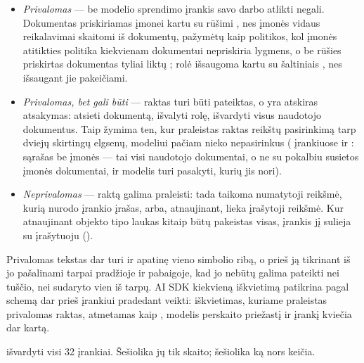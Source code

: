 \begin{itemize}
  \item \emph{Privalomas} --- be modelio sprendimo įrankis savo darbo atlikti negali. Dokumentas
    priskiriamas įmonei kartu su rūšimi , nes įmonės vidaus reikalavimai skaitomi iš
    dokumentų, pažymėtų kaip politikos, kol įmonės atitikties politika kiekvienam dokumentui
    nepriskiria lygmens, o be rūšies priskirtas dokumentas tyliai liktų ; rolė
    išsaugoma kartu su šaltiniais , nes išsaugant jie pakeičiami.
  \item \emph{Privalomas, bet gali būti } --- raktas turi būti pateiktas, o
     yra atskiras atsakymas: atsieti dokumentą, išvalyti rolę, išvardyti visus
    naudotojo dokumentus. Taip žymima ten, kur praleistas raktas reikštų pasirinkimą tarp
    dviejų skirtingų elgsenų, modeliui pačiam nieko nepasirinkus ( įrankiuose
     ir : sąrašas be įmonės --- tai visi
    naudotojo dokumentai, o ne su pokalbiu susietos įmonės dokumentai, ir modelis turi
    pasakyti, kurių jis nori).
  \item \emph{Neprivalomas} --- raktą galima praleisti: tada taikoma numatytoji reikšmė, kurią
    nurodo įrankio įrašas, arba, atnaujinant, lieka įrašytoji reikšmė. Kur atnaujinant objekto
    tipo laukas kitaip būtų pakeistas visas, įrankis jį sulieja su įrašytuoju
    ().
\end{itemize}

Privalomas tekstas dar turi ir apatinę vieno simbolio ribą, o prieš ją tikrinant iš jo
pašalinami tarpai pradžioje ir pabaigoje, kad jo nebūtų galima pateikti nei tuščio, nei
sudaryto vien iš tarpų. AI SDK kiekvieną iškvietimą patikrina pagal schemą dar prieš įrankiui pradedant veikti:
iškvietimas, kuriame praleistas privalomas raktas, atmetamas kaip ,
modelis perskaito priežastį ir įrankį kviečia dar kartą.

 išvardyti visi 32 įrankiai. Šešiolika jų tik skaito; šešiolika ką nors
keičia.

